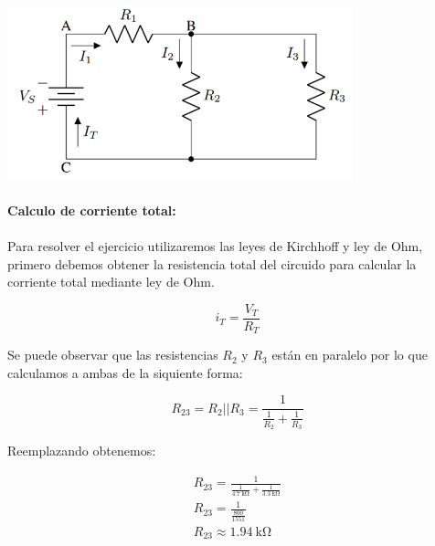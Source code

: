\documentclass[a4paper,12pt]{article}
\begin{document}
\paragraph{}
\paragraph{}
\includegraphics[width=10cm]{imagenes/circuito.png}\\[1.5cm]

\paragraph{Calculo de corriente total:}
\paragraph{}
Para resolver el ejercicio utilizaremos las leyes de Kirchhoff y ley de Ohm, primero debemos obtener la resistencia total del circuido para calcular la corriente total mediante ley de Ohm.

\begin{equation*}
    i_T = \frac{V_T}{R_T}
\end{equation*}

\vspace{1cm}

Se puede observar que las resistencias $R_2$ y $R_3$ están en paralelo por lo que calculamos a ambas de la siquiente forma:

\begin{equation*}
    R_{23} = R_2 || R_3 = \frac{1}{\frac{1}{R_2}+\frac{1}{R_3}}
\end{equation*}

Reemplazando obtenemos:

\begin{align*}
      R_{23} = \frac{1}{\frac{1}{\SI{4.7}{\kilo\ohm}}+\frac{1}{\SI{3.3}{\kilo\ohm}}} \\[0.5cm]
      R_{23} = \frac{1}{\frac{800}{1551}} \\[0.5cm]
      R_{23} \approx \SI{1.94}{\kilo\ohm}
\end{align*}
\end{document}
